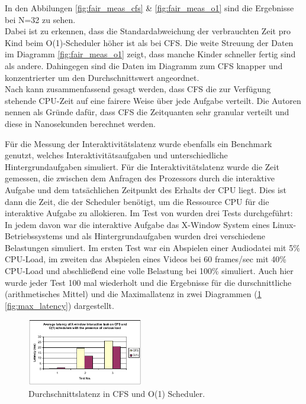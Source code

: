 In den Abbilungen \ref{fig:fair_meas_cfs} \& \ref{fig:fair_meas_o1} sind die Ergebnisse bei N=32 zu sehen. \\
Dabei ist zu erkennen, dass die Standardabweichung der verbrauchten Zeit pro Kind beim O(1)-Scheduler höher ist als bei CFS. Die weite Streuung der Daten im Diagramm \ref{fig:fair_meas_o1} zeigt, dass manche Kinder schneller fertig sind als andere. Dahingegen sind die Daten im Diagramm zum CFS knapper und konzentrierter um den Durchschnittswert angeordnet. \\
Nach \cite{papercomparison} kann zusammenfassend gesagt werden, dass CFS die zur Verfügung stehende CPU-Zeit auf eine fairere Weise über jede Aufgabe verteilt. Die Autoren nennen als Grün\-de dafür, dass CFS die Zeitquanten sehr granular verteilt und diese in Nanosekunden berechnet werden.

Für die Messung der Interaktivitätslatenz wurde ebenfalls ein Benchmark genutzt, welches Interaktivitätsaufgaben und unterschiedliche Hintergrundaufgaben simuliert. Für die Interaktivitätslatenz wurde die Zeit gemessen, die zwischen dem Anfragen des Prozessors durch die interaktive Aufgabe und dem tatsächlichen Zeitpunkt des Erhalts der CPU liegt. Dies ist dann die Zeit, die der Scheduler benötigt, um die Ressource CPU für die interaktive Aufgabe zu allokieren. Im Test von \cite{papercomparison} wurden drei Tests durchgeführt: In jedem davon war die interaktive Aufgabe das X-Window System eines Linux-Betriebssystems und als Hintergrundaufgaben wurden drei verschiedene Belastungen simuliert. Im ersten Test war ein Abspielen einer Audiodatei mit 5\% CPU-Load, im zweiten das Abspielen eines Videos bei 60 frames/sec mit 40\% CPU-Load und abschließend eine volle Belastung bei 100\% simuliert. Auch hier wurde jeder Test 100 mal wiederholt und die Ergebnisse für die durschnittliche (arithmetisches Mittel) und die Maximallatenz in zwei Diagrammen (\ref{fig:avg_latency} \ref{fig:max_latency}) dargestellt. 
\begin{figure} [h]
 	\centering
 	\includegraphics[width=0.45\textwidth]{pictures/avg_latency.png}
 	\caption{Durchschnittslatenz in CFS und O(1) Scheduler.}
 	\label{fig:avg_latency}
\end{figure}

